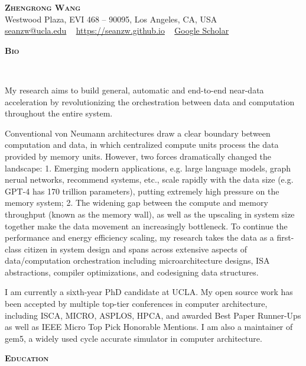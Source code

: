 \documentclass[a4paper]{article}
\def\justifying{%
  \rightskip=0pt
  \spaceskip=0pt
  \xspaceskip=0pt
  \relax
}
\newenvironment{changemargin}[2]{%
  \begin{list}{}{%
    \setlength{\topsep}{0pt}%
    \setlength{\leftmargin}{#1}%
    \setlength{\rightmargin}{#2}%
    \setlength{\listparindent}{\parindent}%
    \setlength{\itemindent}{\parindent}%
    \setlength{\parsep}{\parskip}%
  }%
  \item[]}{\end{list}
}
\newcommand{\lineover}{
	\begin{changemargin}{-0.05in}{-0.05in}
		\vspace*{-8pt}
		\hrulefill \\
		\vspace*{-2pt}
	\end{changemargin}
}
\newcommand{\header}[1]{
	\begin{changemargin}{-0.5in}{-0.5in}
		\scshape{\large \textbf{#1}}\\
  	\lineover
	\end{changemargin}
}
\newcommand{\contact}[4]{
	\begin{changemargin}{-0.5in}{-0.5in}
		\begin{center}
			{\LARGE \scshape \textbf{#1}}\\ \smallskip
			404 Westwood Plaza, EVI 468 – 90095, Los Angeles, CA, USA\\ \smallskip
			{\href{#2}{#2}} ~ \smallskip 
			{\href{#3}{#3}} ~
			{\href{#4}{Google Scholar}}\smallskip
		\end{center}
	\end{changemargin}
}
\newenvironment{body} {
	\vspace*{-16pt}
	\begin{changemargin}{-0.5in}{-0.5in}
  }	
	{\end{changemargin}
}
\begin{document}
\contact{Zhengrong Wang}{seanzw@ucla.edu}{https://seanzw.github.io}{https://scholar.google.com/citations?user=h\_GwGfQAAAAJ\&hl=en}

\header{Bio}

\begin{body}
	\vspace{14pt}
	\justifying
    \setlength{\parindent}{20pt}%
	
	\indent
	My research aims to build general, automatic and end-to-end near-data acceleration 
	by revolutionizing the orchestration between data and computation throughout the
	entire system.

	\indent
	Conventional von Neumann architectures draw a clear boundary between computation and
	data, in which centralized compute units process the data provided by memory units.
	However, two forces dramatically changed the landscape: 1. Emerging modern applications,
	e.g. large language models, graph nerual networks, recommend systems, etc., scale rapidly
	with the data size (e.g. GPT-4 has 170 trillion parameters), putting extremely high
	pressure on the memory system; 2. The widening gap between the compute and memory
	throughput (known as the memory wall), as well as the upscaling in system size together
	make the data movement an increasingly bottleneck. To continue the performance and
	energy efficiency scaling, my research takes the data as a first-class citizen in
	system design and spans across extensive aspects of data/computation orchestration
	including microarchitecture designs, ISA abstractions, compiler optimizations, and
	codesigning data structures.

	\indent
	I am currently a sixth-year PhD candidate at UCLA. My open source work has been accepted by
	multiple top-tier conferences in computer architecture, including ISCA, MICRO, ASPLOS,
	HPCA, and awarded Best Paper Runner-Ups as well as IEEE Micro Top Pick Honorable
	Mentions. I am also a maintainer of gem5, a widely used cycle accurate simulator in
	computer architecture.

\end{body}

\smallskip
\smallskip

\header{Education}
\end{document}
